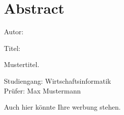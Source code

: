 \chapter*{Abstract}
\begin{flushleft}
Autor: \theauthor
\begin{center}
    Titel:

    Mustertitel.
\end{center}

Studiengang: Wirtschaftsinformatik\\
Prüfer: Max Mustermann

Auch hier könnte Ihre werbung stehen.

\end{flushleft}